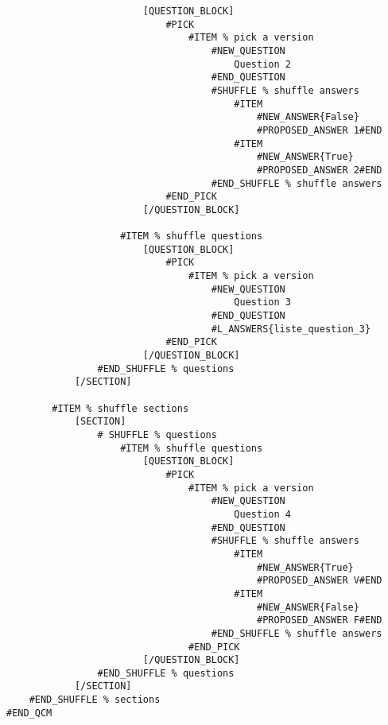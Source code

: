 \documentclass[a4paper,10pt]{article}
\begin{document}
\begin{lstlisting}
                        [QUESTION_BLOCK]
                            #PICK
                                #ITEM % pick a version
                                    #NEW_QUESTION
                                        Question 2
                                    #END_QUESTION
                                    #SHUFFLE % shuffle answers
                                        #ITEM
                                            #NEW_ANSWER{False}
                                            #PROPOSED_ANSWER 1#END
                                        #ITEM
                                            #NEW_ANSWER{True}
                                            #PROPOSED_ANSWER 2#END
                                    #END_SHUFFLE % shuffle answers
                            #END_PICK
                        [/QUESTION_BLOCK]

                    #ITEM % shuffle questions
                        [QUESTION_BLOCK]
                            #PICK
                                #ITEM % pick a version
                                    #NEW_QUESTION
                                        Question 3
                                    #END_QUESTION
                                    #L_ANSWERS{liste_question_3}
                            #END_PICK
                        [/QUESTION_BLOCK]
                #END_SHUFFLE % questions
            [/SECTION]

        #ITEM % shuffle sections
            [SECTION]
                # SHUFFLE % questions
                    #ITEM % shuffle questions
                        [QUESTION_BLOCK]
                            #PICK
                                #ITEM % pick a version
                                    #NEW_QUESTION
                                        Question 4
                                    #END_QUESTION
                                    #SHUFFLE % shuffle answers
                                        #ITEM
                                            #NEW_ANSWER{True}
                                            #PROPOSED_ANSWER V#END
                                        #ITEM
                                            #NEW_ANSWER{False}
                                            #PROPOSED_ANSWER F#END
                                    #END_SHUFFLE % shuffle answers
                                #END_PICK
                        [/QUESTION_BLOCK]
                #END_SHUFFLE % questions
            [/SECTION]
    #END_SHUFFLE % sections 
#END_QCM
\end{lstlisting}
\end{document}
